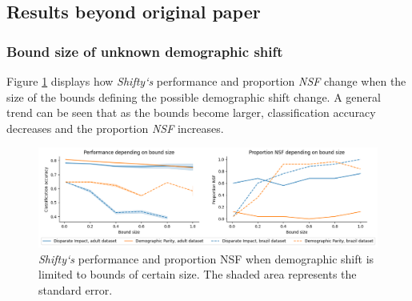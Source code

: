 


\subsection{Results beyond original paper}

\subsubsection{Bound size of unknown demographic shift} Figure \ref{fig:bounds} displays how \textit{Shifty`s} performance and proportion \textit{NSF} change when the size of the bounds defining the possible demographic shift change. A general trend can be seen that as the bounds become larger, classification accuracy decreases and the proportion \textit{NSF} increases. 

\begin{figure}[H]
\centering
\includegraphics[width=\textwidth]{img/charts/Bounds.png}
\caption{\textit{Shifty`s} performance and proportion  NSF when demographic shift is limited to bounds of certain size. The shaded area represents the standard error.}
\label{fig:bounds}
\end{figure}

